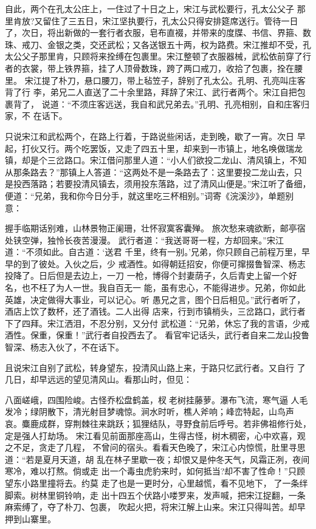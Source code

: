 自此，两个在孔太公庄上，一住过了十日之上，宋江与武松要行，孔太公父子
那里肯放?又留住了三五日，宋江坚执要行，孔太公只得安排筵席送行。管待一日
了，次日，将出新做的一套行者衣服，皂布直裰，并带来的度牒、书信、界箍、数
珠、戒刀、金银之类，交还武松；又各送银五十两，权为路费。宋江推却不受，孔
太公父子那里肯，只顾将来拴缚在包裹里。宋江整顿了衣服器械，武松依前穿了行
者的衣裳，带上铁界箍，挂了人顶骨数珠，跨了两口戒刀，收拾了包裹，拴在腰里。
宋江提了朴刀，悬口腰刀，带上毡笠子，辞别了孔太公。孔明、孔亮叫庄客背了行
李，弟兄二人直送了二十余里路，拜辞了宋江、武行者两个。宋江自把包裹背了，
说道：“不须庄客远送，我自和武兄弟去。”孔明、孔亮相别，自和庄客归家，不
在话下。

只说宋江和武松两个，在路上行着，于路说些闲话，走到晚，歇了一宵。次日
早起，打伙又行。两个吃罢饭，又走了四五十里，却来到一市镇上，地名唤做瑞龙
镇，却是个三岔路口。宋江借问那里人道：“小人们欲投二龙山、清风镇上，不知
从那条路去？”那镇上人答道：“这两处不是一条路去了：这里要投二龙山去，只
是投西落路；若要投清风镇去，须用投东落路，过了清风山便是。”宋江听了备细，
便道：“兄弟，我和你今日分手，就这里吃三杯相别。”词寄《浣溪沙》，单题别
意：

握手临期话别难，山林景物正阑珊，壮怀寂寞客囊殚。
旅次愁来魂欲断，邮亭宿处铗空弹，独怜长夜苦漫漫。
武行者道：“我送哥哥一程，方却回来。”宋江道：“不须如此。自古道：‘送君
千里，终有一别。’兄弟，你只顾自己前程万里，早早的到了彼处。入伙之后，少
戒酒性。如得朝廷招安，你便可撺掇鲁智深、杨志投降了。日后但是去边上，一刀
一枪，博得个封妻荫子，久后青史上留一个好名，也不枉了为人一世。我自百无一
能，虽有忠心，不能得进步。兄弟，你如此英雄，决定做得大事业，可以记心。听
愚兄之言，图个日后相见。”武行者听了，酒店上饮了数杯，还了酒钱。二人出得
店来，行到市镇梢头，三岔路口，武行者下了四拜。宋江洒泪，不忍分别，又分付
武松道：“兄弟，休忘了我的言语，少戒酒性。保重，保重！”武行者自投西去了。
看官牢记话头，武行者自来二龙山投鲁智深、杨志入伙了，不在话下。

且说宋江自别了武松，转身望东，投清风山路上来，于路只忆武行者。又自行
了几日，却早远远的望见清风山。看那山时，但见：

八面嵯峨，四围险峻。古怪乔松盘鹤盖，杈老树挂藤萝。瀑布飞流，寒气逼
人毛发冷；绿阴散下，清光射目梦魂惊。涧水时听，樵人斧响；峰峦特起，山鸟声
哀。麋鹿成群，穿荆棘往来跳跃；狐狸结队，寻野食前后呼号。若非佛祖修行处，
定是强人打劫场。
宋江看见前面那座高山，生得古怪，树木稠密，心中欢喜，观之不足，贪走了几程，
不曾问的宿头。看看天色晚了，宋江心内惊慌，肚里寻思道：“若是夏月天道，胡
乱在林子里歇一夜；却恨又是仲冬天气，风霜正冽，夜间寒冷，难以打熬。倘或走
出一个毒虫虎豹来时，如何抵当?却不害了性命！”只顾望东小路里撞将去。约莫
走了也是一更时分，心里越慌，看不见地下，了一条绊脚索。树林里铜铃响，走
出十四五个伏路小喽罗来，发声喊，把宋江捉翻，一条麻索缚了，夺了朴刀、包裹，
吹起火把，将宋江解上山来。宋江只得叫苦。却早押到山寨里。

